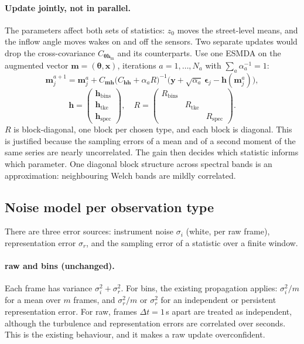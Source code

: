 \documentclass[11pt,a4paper]{article}
\begin{document}
\paragraph{Update jointly, not in parallel.} The parameters affect both sets of
statistics: $z_0$ moves the street-level means, and the inflow angle moves
wakes on and off the sensors. Two separate updates would drop the
cross-covariance $C_{\bm\theta \bm h_{\mathrm{m}}}$ and its counterparts. Use one
ESMDA on the augmented vector $\bm m = (\bm\theta, \bm x)$, iterations
$a = 1,\dots,N_a$ with $\sum_a \alpha_a^{-1} = 1$:
\begin{equation}
  \bm m_j^{a+1} = \bm m_j^{a}
  + C_{\bm m \bm h}\big(C_{\bm h\bm h} + \alpha_a R\big)^{-1}
    \big(\bm y + \sqrt{\alpha_a}\,\bm\epsilon_j - \bm h(\bm m_j^a)\big),
\end{equation}
\begin{equation}
  \bm h = \begin{pmatrix}\bm h_{\mathrm{bins}}\\ \bm h_{\mathrm{tke}}\\
    \bm h_{\mathrm{spec}}\end{pmatrix},
  \quad
  R = \begin{pmatrix} R_{\mathrm{bins}} & & \\ & R_{\mathrm{tke}} & \\
    & & R_{\mathrm{spec}}\end{pmatrix}.
\end{equation}
$R$ is block-diagonal, one block per chosen type, and each block is diagonal.
This is justified because the sampling errors of a mean and of a second
moment of the same series are nearly uncorrelated. The gain then decides which
statistic informs which parameter. One diagonal block structure across
spectral bands is an approximation: neighbouring Welch bands are mildly
correlated.

\subsection{Noise model per observation type}
There are three error sources: instrument noise $\sigma_i$ (white, per raw
frame), representation error $\sigma_r$, and the sampling error of a
statistic over a finite window.

\paragraph{raw and bins (unchanged).} Each frame has variance
$\sigma_i^2 + \sigma_r^2$. For bins, the existing propagation applies:
$\sigma_i^2/m$ for a mean over $m$ frames, and $\sigma_r^2/m$ or $\sigma_r^2$ for
an independent or persistent representation error. For raw, frames
$\Delta t = 1$\,s apart are treated as independent, although the turbulence
and representation errors are correlated over seconds. This is the existing
behaviour, and it makes a raw update overconfident.
\end{document}
